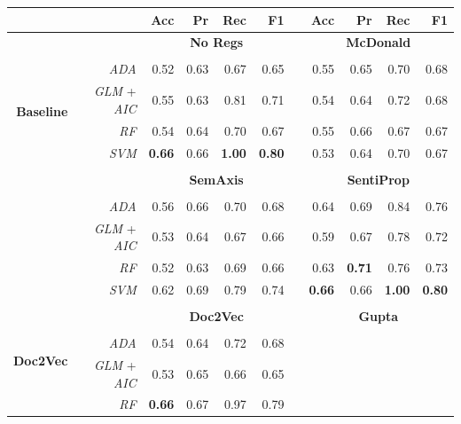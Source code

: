 \documentclass[a4paper, 12pt]{report}
\begin{document}
    \begin{table}[H]
    \setlength{\columnwidth}{1pt}
    \centering
    \begin{threeparttable}
   \begin{tabular}{rrrrrrrrrrr}
      \hline
     & & \textbf{Acc} & \textbf{Pr} & \textbf{Rec} & \textbf{F1} & & \textbf{Acc} & \textbf{Pr} & \textbf{Rec} & \textbf{F1} \\ 
      \midrule
      \multirow{8}{*}{\textbf{Baseline}} & & \multicolumn{4}{c}{\textbf{No Regs}} & & \multicolumn{4}{c}{\textbf{McDonald}} \\
      \cmidrule{3-11}\\
      & \textit{ADA} & 0.52 & 0.63 & 0.67 & 0.65 & & 0.55 & 0.65 & 0.70 & 0.68  \\ 
      & \textit{GLM} + \textit{AIC} &  0.55 & 0.63 & 0.81 & 0.71 & & 0.54 & 0.64 & 0.72 & 0.68  \\ 
      & \textit{RF} & 0.54 & 0.64 & 0.70 & 0.67 & & 0.55 & 0.66 & 0.67 & 0.67\\ 
      & \textit{SVM} & \textbf{0.66} & 0.66 & \textbf{1.00} & \textbf{0.80} & & 0.53 & 0.64 & 0.70 & 0.67 \\ 
      \multicolumn{9}{c}{} \\
      \multirow{8}{*}{\textbf{ID}} & & \multicolumn{4}{c}{\textbf{SemAxis}} & & \multicolumn{4}{c}{\textbf{SentiProp}} \\
      \cmidrule{3-11}\\
       & \textit{ADA} & 0.56 & 0.66 & 0.70 & 0.68 & & 0.64 & 0.69 & 0.84 & 0.76\\ 
      & \textit{GLM} + \textit{AIC} & 0.53 & 0.64 & 0.67 & 0.66 & & 0.59 & 0.67 & 0.78 & 0.72 \\ 
      & \textit{RF} &  0.52 & 0.63 & 0.69 & 0.66 & & 0.63 & \textbf{0.71} & 0.76 & 0.73 \\ 
      & \textit{SVM} & 0.62 & 0.69 & 0.79 & 0.74 & & \textbf{0.66} & 0.66 & \textbf{1.00} & \textbf{0.80} \\
      \multicolumn{9}{c}{} \\
      \multirow{8}{*}{\textbf{Doc2Vec}} & & \multicolumn{4}{c}{\textbf{Doc2Vec}} & & \multicolumn{4}{c}{\textbf{Gupta}} \\
       \cmidrule{3-11}\\
      & \textit{ADA} & 0.54 & 0.64 & 0.72 & 0.68 & \multicolumn{5}{c}{} \\ 
      & \textit{GLM} + \textit{AIC} & 0.53 & 0.65 & 0.66 & 0.65 & \multicolumn{5}{c}{} \\ 
      & \textit{RF} & \textbf{0.66} & 0.67 & 0.97 & 0.79 &  \multicolumn{5}{c}{}\\ 

\end{tabular}
\end{threeparttable}
\end{table}
\end{document}
